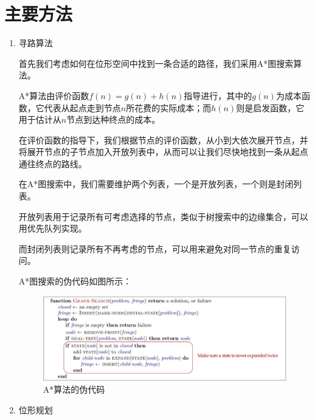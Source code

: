 \documentclass[conference]{IEEEtran}
\begin{document}
\section{主要方法}
\begin{enumerate}
    \item 寻路算法

    首先我们考虑如何在位形空间中找到一条合适的路径，我们采用A*图搜索算法。

    A*算法由评价函数$f(n)=g(n)+h(n)$指导进行，其中的$g(n)$为成本函数，它代表从起点走到节点$n$所花费的实际成本；而$h(n)$则是启发函数，它用于估计从$n$节点到达种终点的成本。

    在评价函数的指导下，我们根据节点的评价函数，从小到大依次展开节点，并将展开节点的子节点加入开放列表中，从而可以让我们尽快地找到一条从起点通往终点的路线。

    在A*图搜索中，我们需要维护两个列表，一个是开放列表，一个则是封闭列表。
    
    开放列表用于记录所有可考虑选择的节点，类似于树搜索中的边缘集合，可以用优先队列实现。

    而封闭列表则记录所有不再考虑的节点，可以用来避免对同一节点的重复访问。

    A*图搜索的伪代码如图所示：

    \begin{figure}[htbp]
        \includegraphics[width=\linewidth]{A.png}
        \caption{A*算法的伪代码}
    \end{figure}

    \item 位形规划


\end{enumerate}
\end{document}
